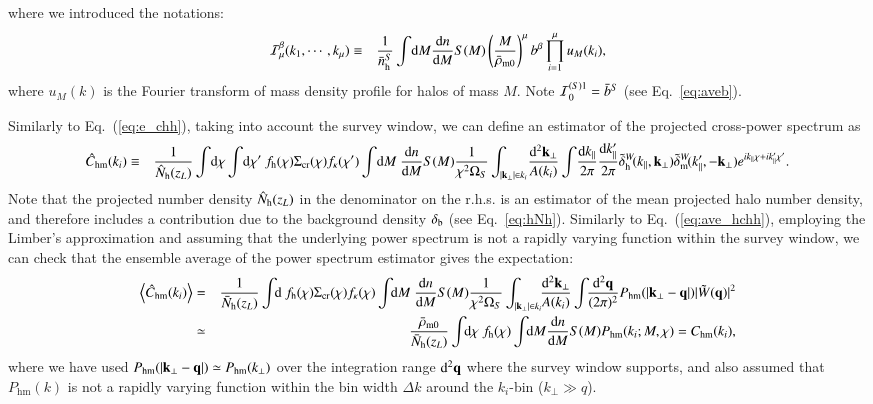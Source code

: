 \documentclass[onecolumn,notitlepage,showpacs,amsmath,amssymb,prd,floatfix]{revtex4-1}
\def\ave#1{\left\langle #1 \right\rangle}
\newcommand{\bk}{{\bf k}}
\newcommand{\bq}{{\bf q}}
\newcommand{\tW}{\tilde{W}}
\newcommand{\dr}{\mathrm{d}}
\newcommand{\deltab}{\delta_{\rm b}}
\newcommand{\tdeltam}{\tilde{\delta}_{\mathrm{m}}}
\newcommand{\phm}{P_{\mathrm{hm}}}
\newcommand{\chm}{C_{\mathrm{hm}}}
\newcommand{\hchm}{\hat{C}_{\mathrm{hm}}}
\newcommand{\bh}{\mathrm{h}}
\newcommand{\bnh}{\frac{\dr n}{\dr M}}
\newcommand{\bnhs}{\bar{n}_{\rm h}^S}
\newcommand{\sigmacr}{\Sigma_{\rm cr}}
\newcommand{\hNh}{\hat{N}_{\rm h}}
\newcommand{\bNh}{\bar{N}_{\rm h}}
\newcommand{\tdeltah}{\tilde{\delta}_{\rm h}}
\begin{document}
%
where we introduced the notations:
%
\begin{eqnarray}
 {\cal I}^{\beta}_\mu(k_1,\cdots,k_\mu)&\equiv&\frac{1}{\bnhs}
  \int\!\dr M\bnh S(M)
  \left(\frac{M}{\bar{\rho}_{\rm m0}}\right)^\mu
  b^\beta\prod_{i=1}^\mu u_M(k_i),
\end{eqnarray}
%
where $u_M(k)$ is the Fourier transform of mass density profile for
halos of mass $M$. Note ${\cal I}^{(S)1}_0=\bar{b}^S$ (see Eq.~\ref{eq:aveb}).


Similarly to Eq.~(\ref{eq:e_chh}), taking into account the survey
window, we can define an estimator of the projected cross-power spectrum
as
%
\begin{eqnarray}
 \hchm(k_i)&\equiv & \frac{1}{\hNh(z_L)}\int\!\dr\chi\int\!\dr\chi'~f_\bh(\chi)
  \sigmacr(\chi)
  f_\kappa(\chi')\int\!\dr M~\bnh S(M)
  \frac{1}{\chi^2\Omega_S}
  \int_{|\bk_\perp|\in k_i}\!\frac{\dr^2\bk_\perp}{A(k_i)}\int\!\frac{\dr k_\parallel}{2\pi}
  \frac{\dr k^{\prime }_\parallel}{2\pi}
  \tdeltah^W\!(k_\parallel,\bk_\perp)\tdeltam^W\!(k'_\parallel,-\bk_\perp)
  e^{ik_\parallel\chi+ ik'_\parallel\chi'}.\nonumber\\
\label{eq:e_chm}
\end{eqnarray}
%
Note that the projected number density $\hNh(z_L)$ in the denominator on
the r.h.s. is an estimator of the mean projected halo number density, and
therefore includes a contribution due to the background density
$\deltab$ (see Eq.~\ref{eq:hNh}). Similarly to Eq.~(\ref{eq:ave_hchh}),
employing the Limber's approximation and assuming that the underlying
power spectrum is not a rapidly varying function within the survey
window, we can check that the ensemble average of the power spectrum
estimator gives the expectation:
%
\begin{eqnarray}
\ave{\hchm(k_i)}&=&\frac{1}{\bNh(z_L)}\int\!\!\dr~f_{\rm
 h}(\chi)\sigmacr(\chi)f_\kappa(\chi)\int\!\!\dr M~\bnh S(M)
 \frac{1}{\chi^2\Omega_S}\int_{|\bk_\perp|\in
 k_i}\!\!\frac{\dr^2\bk_\perp}{A(k_i)}
 \int\!\!\frac{\dr^2\bq}{(2\pi)^2}\phm(|\bk_\perp-\bq|)|\tW(\bq)|^2\nonumber\\
 &\simeq& \frac{\bar{\rho}_{\rm m0}}{\bNh(z_L)}
  \int\!\!\dr\chi~f_{\rm h}(\chi)\int\!\!\dr M \bnh
  S(M)\phm(k_i;M,\chi)=\chm(k_i), 
\end{eqnarray}
%
where we have used $\phm(|\bk_\perp-\bq|)\simeq \phm(k_\perp)$ over the
integration range $\dr^2\bq$ where the survey window supports, and also
assumed that $\phm(k)$ is not a rapidly varying function within the bin
width $\Delta k$ around the $k_i$-bin ($k_\perp \gg q$).
\end{document}
